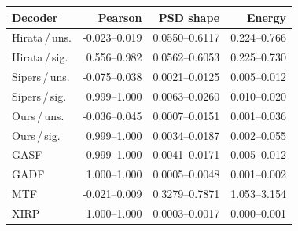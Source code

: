 \begin{tabular}{@{}lrrr@{}}
\toprule
Decoder & Pearson & PSD shape & Energy \\
\midrule
Hirata\,/\,uns. & -0.023--0.019 & 0.0550--0.6117 & 0.224--0.766 \\
Hirata\,/\,sig. & 0.556--0.982 & 0.0562--0.6053 & 0.225--0.730 \\
Sipers\,/\,uns. & -0.075--0.038 & 0.0021--0.0125 & 0.005--0.012 \\
Sipers\,/\,sig. & 0.999--1.000 & 0.0063--0.0260 & 0.010--0.020 \\
Ours\,/\,uns. & -0.036--0.045 & 0.0007--0.0151 & 0.001--0.036 \\
Ours\,/\,sig. & 0.999--1.000 & 0.0034--0.0187 & 0.002--0.055 \\
GASF & 0.999--1.000 & 0.0041--0.0171 & 0.005--0.012 \\
GADF & 1.000--1.000 & 0.0005--0.0048 & 0.001--0.002 \\
MTF & -0.021--0.009 & 0.3279--0.7871 & 1.053--3.154 \\
XIRP & 1.000--1.000 & 0.0003--0.0017 & 0.000--0.001 \\
\bottomrule
\end{tabular}
